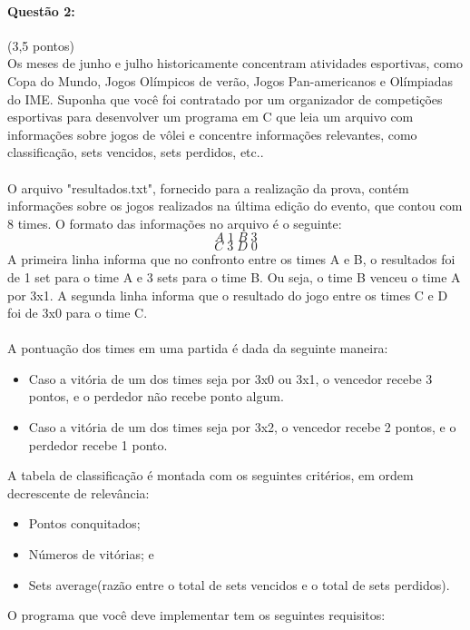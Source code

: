 \documentclass[12pt,a4paper]{article}
\begin{document}
\paragraph{Questão 2:}(3,5 pontos)\\
Os meses de junho e julho historicamente concentram atividades esportivas, como Copa do Mundo, Jogos Olímpicos de verão, Jogos Pan-americanos e Olímpiadas do IME. Suponha que você foi contratado por um organizador de competições esportivas para desenvolver um programa em C que leia um arquivo com informações sobre jogos de vôlei e concentre informações relevantes, como classificação, sets vencidos, sets perdidos, etc..\\
\\
O arquivo "resultados.txt", fornecido para a realização da prova, contém informações sobre os jogos realizados na última edição do evento, que contou com 8 times. O formato das informações no arquivo é o seguinte:
$$A\; 1\; B\; 3$$
$$C\; 3\; D\; 0$$
A primeira linha informa que no confronto entre os times A e B, o resultados foi de 1 set para o time A e 3 sets para o time B. Ou seja, o time B venceu o time A por 3x1. A segunda linha informa que o resultado do jogo entre os times C e D foi de 3x0 para o time C.\\
\\
A pontuação dos times em uma partida é dada da seguinte maneira:
\begin{itemize}
\item Caso a vitória de um dos times seja por 3x0 ou 3x1, o vencedor recebe 3 pontos, e o perdedor não recebe ponto algum.
\item Caso a vitória de um dos times seja por 3x2, o vencedor recebe 2 pontos, e o perdedor recebe 1 ponto.
\end{itemize}
A tabela de classificação é montada com os seguintes critérios, em ordem decrescente de relevância:
\begin{itemize}
\item Pontos conquitados;
\item Números de vitórias; e
\item Sets average(razão entre o total de sets vencidos e o total de sets perdidos).
\end{itemize}
O programa que você deve implementar tem os seguintes requisitos:
\end{document}
